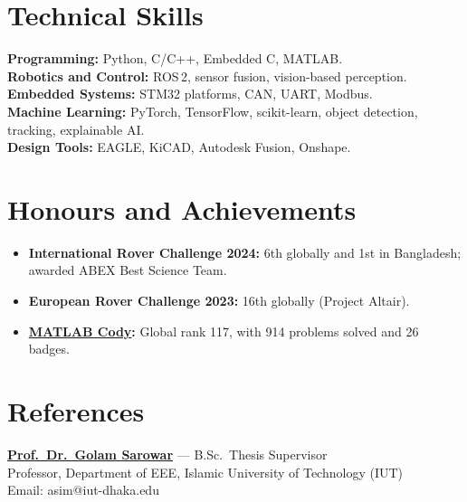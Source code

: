 \documentclass[10pt]{article}
\begin{document}
\vspace{-3pt}
\section*{Technical Skills}
\vspace{-3pt}
\textbf{Programming:} Python, C/C++, Embedded C, MATLAB. \\
\textbf{Robotics and Control:} ROS\,2, sensor fusion, vision-based perception. \\
\textbf{Embedded Systems:} STM32 platforms, CAN, UART, Modbus.\\
\textbf{Machine Learning:} PyTorch, TensorFlow, scikit-learn, object detection, tracking,
explainable AI. \\
\textbf{Design Tools:} EAGLE, KiCAD, Autodesk Fusion, Onshape.

\section*{Honours and Achievements}
\begin{itemize}
    \item \textbf{International Rover Challenge 2024:} 6th globally and 1st in Bangladesh; awarded
    ABEX Best Science Team. 
    \item \textbf{European Rover Challenge 2023:} 16th globally (Project Altair).
    \item \textbf{\href{https://www.mathworks.com/matlabcentral/profile/authors/25804044}{MATLAB
    Cody}:} Global rank 117, with 914 problems solved and 26 badges.
\end{itemize}

\section*{References}
\textbf{\href{https://scholar.google.com/citations?hl=en\&user=3waAWaYAAAAJ\&view_op=list_works\&sortby=pubdate}{Prof.\ Dr.\ Golam Sarowar}} --- B.Sc.\ Thesis Supervisor \\
Professor, Department of EEE, Islamic University of Technology (IUT) \\ 
Email: asim@iut-dhaka.edu
\end{document}
